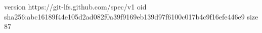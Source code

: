 version https://git-lfs.github.com/spec/v1
oid sha256:abc16189f44e105d2ad082f0a39f9169eb139d97f6100c017b4c9f16efe446e9
size 87

